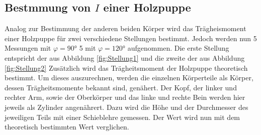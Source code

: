     \subsection{Bestmmung von $I$ einer Holzpuppe}
    Analog zur Bestimmung der anderen beiden Körper wird das Trägheismoment einer Holzpuppe für zwei verschiedene Stellungen bestimmt.
    Jedoch werden nun 5 Messungen mit $\varphi= 90$\unit{\degree} 5  mit $\varphi= 120$\unit{\degree} aufgenommen.
    Die erste Stellung entspricht der aus Abbildung \ref{fig:Stellung1} und die zweite der aus Abbildung \ref{fig:Stellung2} %
    Zusätzlich wird das Trägheitsmoment der Holzpuppe theoretisch bestimmt.
    Um dieses auszurechnen, werden die einzelnen Körperteile als Körper, dessen Trägheitsmomente bekannt sind, genähert.
    Der Kopf, der linker und rechter Arm, sowie der Oberkörper und das linke und rechte Bein werden hier jeweils als Zylinder angenährert.
    Dazu wird die Höhe und der Durchmesser des jeweiligen Teils mit einer Schieblehre gemessen.
    Der Wert wird nun mit dem theoretisch bestimmten Wert verglichen.





